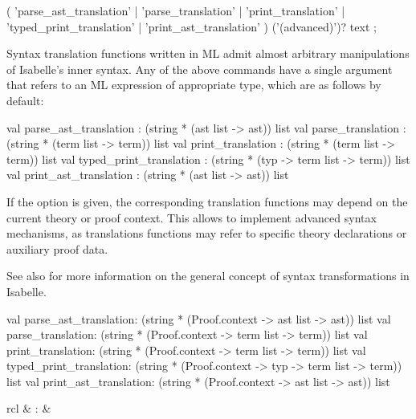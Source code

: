 \begin{isabellebody}
\begin{isamarkuptext}
  \begin{rail}
  ( 'parse_ast_translation' | 'parse_translation' | 'print_translation' |
    'typed_print_translation' | 'print_ast_translation' ) ('(advanced)')? text
  ;
  \end{rail}

  Syntax translation functions written in ML admit almost arbitrary
  manipulations of Isabelle's inner syntax.  Any of the above commands
  have a single  argument that refers to an ML
  expression of appropriate type, which are as follows by default:

\begin{ttbox}
val parse_ast_translation   : (string * (ast list -> ast)) list
val parse_translation       : (string * (term list -> term)) list
val print_translation       : (string * (term list -> term)) list
val typed_print_translation : (string * (typ -> term list -> term)) list
val print_ast_translation   : (string * (ast list -> ast)) list
\end{ttbox}

  If the  option is given, the corresponding
  translation functions may depend on the current theory or proof
  context.  This allows to implement advanced syntax mechanisms, as
  translations functions may refer to specific theory declarations or
  auxiliary proof data.

  See also \cite{isabelle-ref} for more information on the general
  concept of syntax transformations in Isabelle.

\begin{ttbox}
val parse_ast_translation:
  (string * (Proof.context -> ast list -> ast)) list
val parse_translation:
  (string * (Proof.context -> term list -> term)) list
val print_translation:
  (string * (Proof.context -> term list -> term)) list
val typed_print_translation:
  (string * (Proof.context -> typ -> term list -> term)) list
val print_ast_translation:
  (string * (Proof.context -> ast list -> ast)) list
\end{ttbox}%
\end{isamarkuptext}%
\isamarkuptrue%
%
\isamarkuptrue%
%
\begin{isamarkuptext}%
\begin{matharray}{rcl}
    \hypertarget{command.print-syntax}{\hyperlink{command.print-syntax}{\mbox{}}} & : &  \\
  \end{matharray}


\end{isamarkuptext}
\end{isabellebody}
